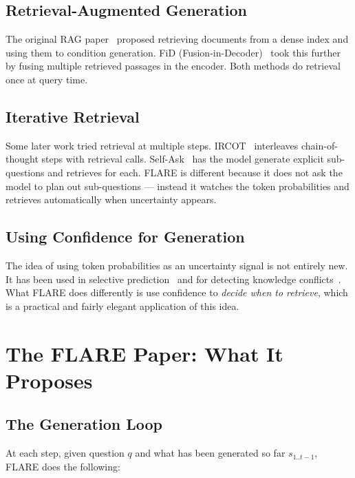 \documentclass[conference]{IEEEtran}
\begin{document}
\subsection{Retrieval-Augmented Generation}
The original RAG paper~\cite{lewis2020rag} proposed retrieving
documents from a dense index and using them to condition generation.
FiD (Fusion-in-Decoder)~\cite{izacard2020leveraging} took this
further by fusing multiple retrieved passages in the encoder.
Both methods do retrieval once at query time.

\subsection{Iterative Retrieval}
Some later work tried retrieval at multiple steps.
IRCOT~\cite{trivedi2022interleaving} interleaves chain-of-thought
steps with retrieval calls. Self-Ask~\cite{press2022measuring} has
the model generate explicit sub-questions and retrieves for each.
FLARE is different because it does not ask the model to plan out
sub-questions — instead it watches the token probabilities and
retrieves automatically when uncertainty appears.

\subsection{Using Confidence for Generation}
The idea of using token probabilities as an uncertainty signal is not
entirely new. It has been used in selective
prediction~\cite{kamath2020selective} and for detecting knowledge
conflicts~\cite{longpre2021entity}. What FLARE does differently is
use confidence to \emph{decide when to retrieve}, which is a
practical and fairly elegant application of this idea.

\section{The FLARE Paper: What It Proposes}
\label{sec:paper_overview}

\subsection{The Generation Loop}
At each step, given question $q$ and what has been generated so far
$s_{1..t-1}$, FLARE does the following:
\end{document}
